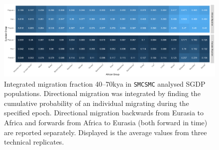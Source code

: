 \begin{figure}
	\centering
	\includegraphics[width=\textwidth]{plot/integrated_sgdp.pdf}
	\caption[Integrated Migration Fraction in the SGDP]{Integrated migration fraction 40--70kya in {\tt SMCSMC} analysed SGDP populations. Directional migration was integrated by finding the cumulative probability of an individual migrating during the specified epoch. Directional migration backwards from Eurasia to Africa and forwards from Africa to Eurasia (both forward in time) are reported separately. Displayed is the average values from three technical replicates.}
	\label{fig:sgdp_heatmap}
\end{figure}

